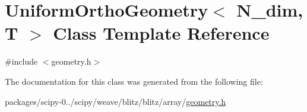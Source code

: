 \hypertarget{classUniformOrthoGeometry}{}\section{Uniform\+Ortho\+Geometry$<$ N\+\_\+dim, T $>$ Class Template Reference}
\label{classUniformOrthoGeometry}


{\ttfamily \#include $<$geometry.\+h$>$}



The documentation for this class was generated from the following file\+:\begin{DoxyCompactItemize}
\item 
packages/scipy-\/0../scipy/weave/blitz/blitz/array/\hyperlink{geometry_8h}{geometry.\+h}\end{DoxyCompactItemize}
